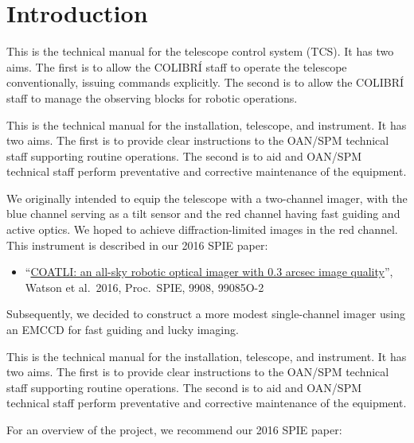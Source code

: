 \chapter{Introduction}
\label{chapter:introduction}

\ifcolibri

This is the technical manual for the {\projectname} telescope control system (TCS). It has two aims. The first is to allow the COLIBRÍ staff to operate the telescope conventionally, issuing commands explicitly. The second is to allow the COLIBRÍ staff to manage the observing blocks for robotic operations.

\fi

\ifcoatli

This is the technical manual for the {\projectname} installation, telescope, and instrument. It has two aims. The first is to provide clear instructions to the OAN/SPM technical staff supporting routine operations. The second is to aid {\projectname} and OAN/SPM technical staff perform preventative and corrective maintenance of the equipment.

We originally intended to equip the telescope with a two-channel imager, with the blue channel serving as a tilt sensor and the red channel having fast guiding and active optics. We hoped to achieve diffraction-limited images in the red channel. This instrument is described in our 2016 SPIE paper:

\begin{itemize}
    \item “\href{bibliography/spie-coatli-2016.pdf}{COATLI: an all-sky robotic optical imager with 0.3 arcsec image quality}”,   Watson et al.\ 2016, Proc.\ SPIE, 9908, 99085O-2
\end{itemize}

Subsequently, we decided to construct a more modest single-channel imager using an EMCCD for fast guiding and lucky imaging.

\fi

\ifddoti

This is the technical manual for the {\projectname} installation, telescope, and instrument. It has two aims. The first is to provide clear instructions to the OAN/SPM technical staff supporting routine operations. The second is to aid {\projectname} and OAN/SPM technical staff perform preventative and corrective maintenance of the equipment.

For an overview of the {\projectname} project, we recommend our 2016 SPIE paper:

